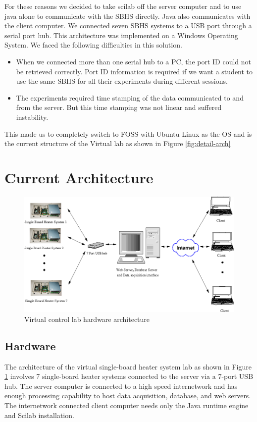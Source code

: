 For these reasons  we decided to take scilab off the server computer
and to use java alone to communicate with the SBHS directly.  Java
also 
communicates with the client computer.  We connected seven SBHS
systems to a USB port through a serial port hub.  This architecture
was 
implemented on a Windows Operating System.  We faced the following
difficulties in this solution.
\begin{itemize}
\item When we connected more than one serial hub to a PC, the port ID
  could not be retrieved correctly.  Port ID information is required
  if we want a student to use the same SBHS for all their experiments
  during different sessions.
\item The experiments required time stamping of the data communicated
  to and from the server. But this time stamping was not linear and
  suffered instability.  
\end{itemize}%
This made us to completely switch to FOSS with Ubuntu Linux as the OS
and is the current structure of the Virtual lab as shown in Figure
\ref{fig:detail-arch} 
\section{Current Architecture}
\label{sec:vlabarchi}
\begin{figure}
\centering
\includegraphics[width=\linewidth]{IEEE-Chile/figures/vlab-arch}
\caption{Virtual control lab hardware architecture}
\label{fig:hw-arch}
\end{figure}

\subsection{Hardware}
The architecture of the virtual single-board heater system lab as
shown in Figure \ref{fig:hw-arch} involves 7 single-board heater
systems connected to the server via a 7-port USB hub. The server
computer is connected to a high speed internetwork and has enough
processing capability to host data acquisition, database, and web
servers. The internetwork connected client computer needs only the
Java runtime engine and Scilab installation.  

